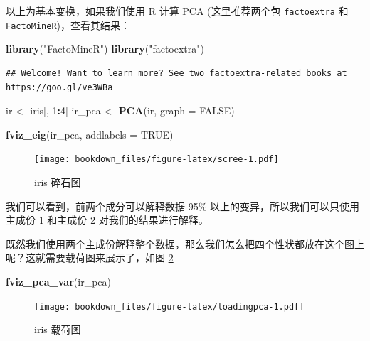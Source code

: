 \documentclass[
]{krantz}
\makeatletter
\newenvironment{Shaded}{\begin{snugshade}}{\end{snugshade}}
\newcommand{\DataTypeTok}[1]{\textcolor[rgb]{0.13,0.29,0.53}{#1}}
\newcommand{\DecValTok}[1]{\textcolor[rgb]{0.00,0.00,0.81}{#1}}
\newcommand{\KeywordTok}[1]{\textcolor[rgb]{0.13,0.29,0.53}{\textbf{#1}}}
\newcommand{\NormalTok}[1]{#1}
\newcommand{\OperatorTok}[1]{\textcolor[rgb]{0.81,0.36,0.00}{\textbf{#1}}}
\newcommand{\OtherTok}[1]{\textcolor[rgb]{0.56,0.35,0.01}{#1}}
\newcommand{\StringTok}[1]{\textcolor[rgb]{0.31,0.60,0.02}{#1}}
\newenvironment{kframe}{%
\medskip{}
\setlength{\fboxsep}{.8em}
 \def\at@end@of@kframe{}%
 \ifinner\ifhmode%
  \def\at@end@of@kframe{\end{minipage}}%
  \begin{minipage}{\columnwidth}%
 \fi\fi%
 \def\FrameCommand##1{\hskip\@totalleftmargin \hskip-\fboxsep
 \colorbox{shadecolor}{##1}\hskip-\fboxsep
     \hskip-\linewidth \hskip-\@totalleftmargin \hskip\columnwidth}%
 \MakeFramed {\advance\hsize-\width
   \@totalleftmargin\z@ \linewidth\hsize
   \@setminipage}}%
 {\par\unskip\endMakeFramed%
 \at@end@of@kframe}
\renewenvironment{Shaded}{\begin{kframe}}{\end{kframe}}
\makeatother
\begin{document}
以上为基本变换，如果我们使用 R 计算 PCA (这里推荐两个包 \texttt{factoextra} 和 \texttt{FactoMineR})，查看其结果：

\begin{Shaded}
\begin{Highlighting}[]
\KeywordTok{library}\NormalTok{(}\StringTok{"FactoMineR"}\NormalTok{)}
\KeywordTok{library}\NormalTok{(}\StringTok{"factoextra"}\NormalTok{)}
\end{Highlighting}
\end{Shaded}

\begin{verbatim}
## Welcome! Want to learn more? See two factoextra-related books at https://goo.gl/ve3WBa
\end{verbatim}

\begin{Shaded}
\begin{Highlighting}[]
\NormalTok{ir <-}\StringTok{ }\NormalTok{iris[, }\DecValTok{1}\OperatorTok{:}\DecValTok{4}\NormalTok{]}
\NormalTok{ir_pca <-}\StringTok{ }\KeywordTok{PCA}\NormalTok{(ir, }\DataTypeTok{graph =} \OtherTok{FALSE}\NormalTok{)}

\KeywordTok{fviz_eig}\NormalTok{(ir_pca, }\DataTypeTok{addlabels =} \OtherTok{TRUE}\NormalTok{)}
\end{Highlighting}
\end{Shaded}

\begin{figure}
\centering
\texttt{[image: bookdown\_files/figure-latex/scree-1.pdf]}
\caption{\label{fig:scree}iris 碎石图}
\end{figure}

我们可以看到，前两个成分可以解释数据 95\% 以上的变异，所以我们可以只使用主成份 1 和主成份 2 对我们的结果进行解释。

既然我们使用两个主成份解释整个数据，那么我们怎么把四个性状都放在这个图上呢？这就需要载荷图来展示了，如图 \ref{fig:loadingpca}

\begin{Shaded}
\begin{Highlighting}[]
\KeywordTok{fviz_pca_var}\NormalTok{(ir_pca)}
\end{Highlighting}
\end{Shaded}

\begin{figure}
\centering
\texttt{[image: bookdown\_files/figure-latex/loadingpca-1.pdf]}
\caption{\label{fig:loadingpca}iris 载荷图}
\end{figure}
\end{document}
